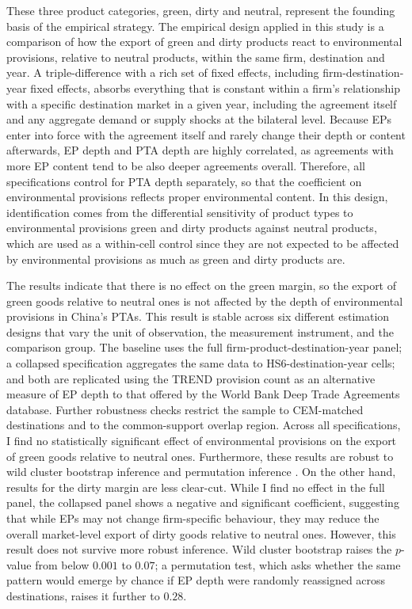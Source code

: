\documentclass[12pt]{article}
\begin{document}
These three product categories, green, dirty and neutral, represent the founding basis of the empirical strategy. The empirical design applied in this study is a comparison of how the export of green and dirty products react to environmental provisions, relative to neutral products, within the same firm, destination and year. A triple-difference with a rich set of fixed effects, including firm-destination-year fixed effects, absorbs everything that is constant within a firm's relationship with a specific destination market in a given year, including the agreement itself and any aggregate demand or supply shocks at the bilateral level. Because EPs enter into force with the agreement itself and rarely change their depth or content afterwards, EP depth and PTA depth are highly correlated, as agreements with more EP content tend to be also deeper agreements overall. Therefore, all specifications control for PTA depth separately, so that the coefficient on environmental provisions reflects proper environmental content. In this design, identification comes from the differential sensitivity of product types to environmental provisions green and dirty products against neutral products, which are used as a within-cell control since they are not expected to be affected by environmental provisions as much as green and dirty products are.

The results indicate that there is no effect on the green margin, so the export of green goods relative to neutral ones is not affected by the depth of environmental provisions in China's PTAs. This result is stable across six different estimation designs that vary the unit of observation, the measurement instrument, and the comparison group. The baseline uses the full firm-product-destination-year panel; a collapsed specification aggregates the same data to HS6-destination-year cells; and both are replicated using the TREND provision count as an alternative measure of EP depth to that offered by the World Bank Deep Trade Agreements database. Further robustness checks restrict the sample to CEM-matched destinations and to the common-support overlap region. Across all specifications, I find no statistically significant effect of environmental provisions on the export of green goods relative to neutral ones. Furthermore, these results are robust to wild cluster bootstrap inference \citep{cameron2008} and permutation inference \citep{youngChannelingFisherRandomization2019}. On the other hand, results for the dirty margin are less clear-cut. While I find no effect in the full panel, the collapsed panel shows a negative and significant coefficient, suggesting that while EPs may not change firm-specific behaviour, they may reduce the overall market-level export of dirty goods relative to neutral ones. However, this result does not survive more robust inference. Wild cluster bootstrap raises the $p$-value from below $0.001$ to $0.07$; a permutation test, which asks whether the same pattern would emerge by chance if EP depth were randomly reassigned across destinations, raises it further to $0.28$.
\end{document}
